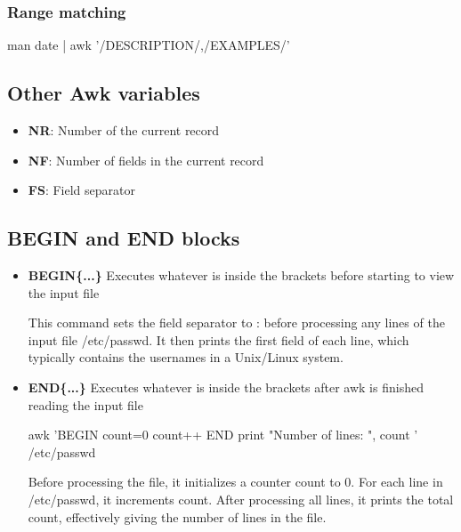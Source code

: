 \documentclass{report}
\begin{document}
    \bigbreak \noindent 
    \subsubsection{Range matching}
    \bigbreak \noindent 
    \begin{bashcode}
        man date | awk '/DESCRIPTION/,/EXAMPLES/'
    \end{bashcode}


    \bigbreak \noindent 
    \subsection{Other Awk variables}
    \bigbreak \noindent 
    \begin{itemize}
        \item \textbf{NR}: Number of the current record
        \item \textbf{NF}: Number of fields in the current record
        \item \textbf{FS}: Field separator
    \end{itemize}

    \bigbreak \noindent 
    \subsection{BEGIN and END blocks}
    \bigbreak \noindent 
    \begin{itemize}
        \item \textbf{BEGIN\{...\}}  Executes whatever is inside the brackets before starting to view the input file 
            \smallbreak \noindent
            This command sets the field separator to : before processing any lines of the input file /etc/passwd. It then prints the first field of each line, which typically contains the usernames in a Unix/Linux system.
        \item \textbf{END\{...\}}  Executes whatever is inside the brackets after awk is finished reading the input file
            \smallbreak \noindent
            \begin{bashcode}
            awk 'BEGIN { count=0 } { count++ } END { print "Number of lines: ", count }' /etc/passwd
            \end{bashcode}
            Before processing the file, it initializes a counter count to 0. For each line in /etc/passwd, it increments count. After processing all lines, it prints the total count, effectively giving the number of lines in the file.
    \end{itemize}
\end{document}
